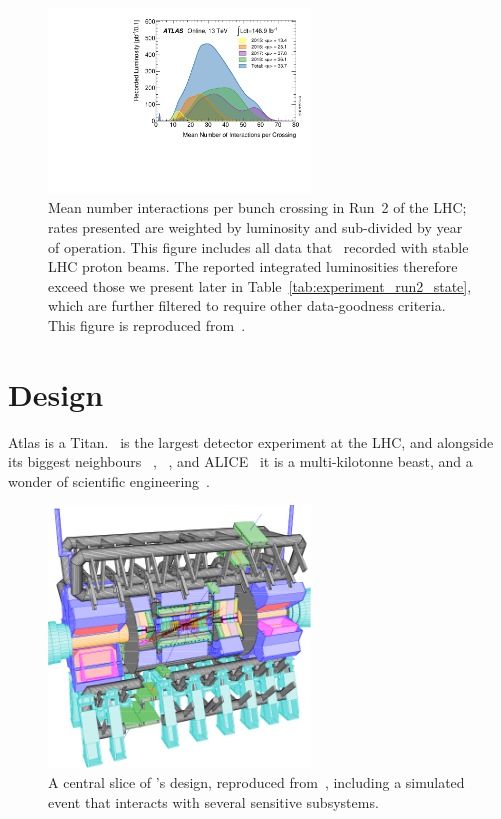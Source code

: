 \begin{figure}[tp]
\centering
\includegraphics[width=0.62\textwidth]{figures/atlas_pileup_mu_2015_2018.pdf}
\caption[
Mean number interactions per bunch crossing in Run~2 of the LHC
]{%
Mean number interactions per bunch crossing in Run~2 of the LHC;
rates presented are weighted by luminosity and sub-divided by year of
operation.
This figure includes all data that \atlas\ recorded with stable LHC proton
beams.
The reported integrated luminosities therefore exceed those we present later
in Table~\ref{tab:experiment_run2_state}, which are further filtered to require
other data-goodness criteria.
This figure is reproduced from~\cite{atlas_public_luminosity}.
}
\label{fig:experiment_run_2_mu}
\end{figure}


\section{Design}
\label{sec:atlas_design}
Atlas is a Titan.
\atlas\ is the largest detector experiment at the LHC,
and alongside its biggest neighbours
\cms~\cite{cms2008experiment},
\lhcb~\cite{lhcb2008experiment},
and ALICE~\cite{alice2008experiment}
it is a multi-kilotonne beast,
and a wonder of scientific engineering~\cite{
atlas1994proposal,
atlas2008experiment,
atlas1999design1,
atlas1999design2
}.

\begin{figure}[tp]
\centering
\includegraphics[width=0.62\textwidth]{figures/atlas_cutaway_volume_1.pdf}
\caption[
A central slice of \atlas's design
]{%
A central slice of \atlas's design, reproduced from~\cite{atlas1999design1,
persint2014manual},
including a simulated event that interacts with several sensitive subsystems.
}
\label{fig:atlas_cutaway}
\end{figure}

